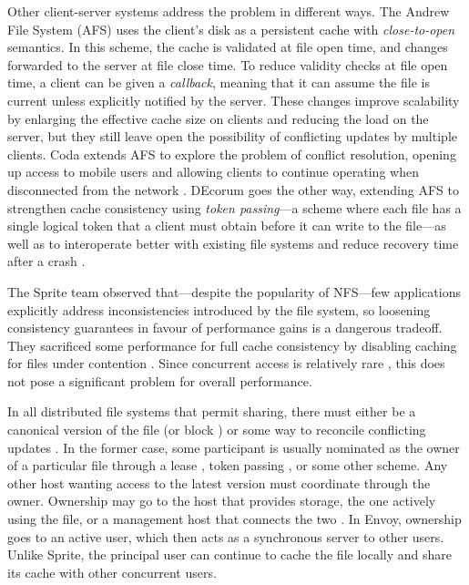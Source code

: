 Other client-server systems address the problem in different ways. The Andrew File System (AFS) \cite{satyanarayanan85,howard} uses the client's disk as a persistent cache with \emph{close-to-open} semantics. In this scheme, the cache is validated at file open time, and changes forwarded to the server at file close time. To reduce validity checks at file open time, a client can be given a \emph{callback}, meaning that it can assume the file is current unless explicitly notified by the server. These changes improve scalability by enlarging the effective cache size on clients and reducing the load on the server, but they still leave open the possibility of conflicting updates by multiple clients. Coda extends AFS to explore the problem of conflict resolution, opening up access to mobile users and allowing clients to continue operating when disconnected from the network \cite{satyanarayanan90,mummert}. DEcorum goes the other way, extending AFS to strengthen cache consistency using \emph{token passing}---a scheme where each file has a single logical token that a client must obtain before it can write to the file---as well as to interoperate better with existing file systems and reduce recovery time after a crash \cite{kazar}.

The Sprite team observed that---despite the popularity of NFS---few applications explicitly address inconsistencies introduced by the file system, so loosening consistency guarantees in favour of performance gains is a dangerous tradeoff. They sacrificed some performance for full cache consistency by disabling caching for files under contention \cite{baker91,nelson,welch}. Since concurrent access is relatively rare \cite{kistler}, this does not pose a significant problem for overall performance.

In all distributed file systems that permit sharing, there must either be a canonical version of the file (or block \cite{mcgregor}) or some way to reconcile conflicting updates \cite{kistler}. In the former case, some participant is usually nominated as the owner of a particular file through a lease \cite{gray89}, token passing \cite{burrows,mann,kazar}, or some other scheme. Any other host wanting access to the latest version must coordinate through the owner. Ownership may go to the host that provides storage, the one actively using the file, or a management host that connects the two \cite{blaze,keleher}. In Envoy, ownership goes to an active user, which then acts as a synchronous server to other users. Unlike Sprite, the principal user can continue to cache the file locally and share its cache with other concurrent users.

